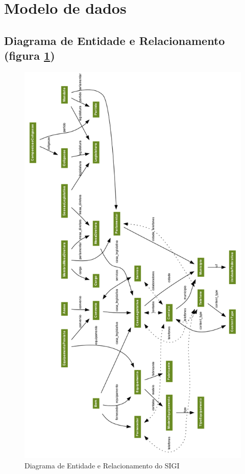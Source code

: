 %
%

\section{Modelo de dados}
\label{sec:modelo}

\subsection{Diagrama de Entidade e Relacionamento (figura \ref{fig:er})}
\begin{figure}[p]
  \centering
  \includegraphics[width=120mm]{../imagens/er.png}
  \caption{Diagrama de Entidade e Relacionamento do SIGI}
  \label{fig:er}
\end{figure}

